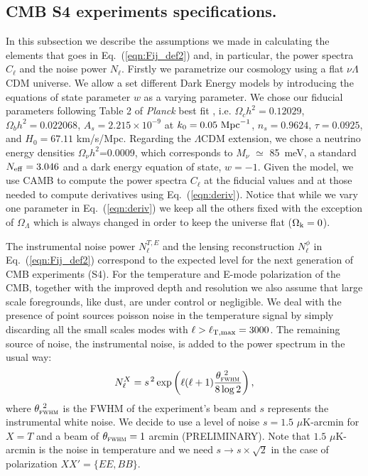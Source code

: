 \documentclass[aps,prd,reprint,superscriptaddress]{revtex4-1}
\newcommand\refeq[1]{Eq.~(\ref{eqn:#1})}
\begin{document}
\subsection{CMB S4 experiments specifications.\label{subsec:cosmo-noise}}
In this subsection we describe the assumptions we made in calculating the elements that goes in \refeq{Fij_def2} and, in particular, the power spectra $C_{\ell}$ and the noise power $N_{\ell}$.
Firstly we parametrize our cosmology using a flat $\nu \Lambda$CDM universe. We allow a set different Dark Energy models by introducing the equations of state parameter $w$ as a varying parameter.
We chose our fiducial parameters following Table 2 of \textit{Planck} best fit \cite{planck-collaboration:2014g}, i.e. $\Omega_c h^2 = 0.12029$, $\Omega_b h^2 = 0.022068$, $A_s = 2.215\times10^{-9}$ at $k_0 = 0.05\ {\rm Mpc}^{-1}$, $n_s = 0.9624$, $\tau = 0.0925$, and $H_0 = 67.11$ km/s/Mpc. Regarding the $\Lambda$CDM extension, we chose a neutrino energy densities $\Omega_{\nu} h^2$=0.0009, which corresponds to $M_{\nu}$ $\simeq$ 85\ meV, a standard $N_{\rm eff}=3.046$ and a dark energy equation of state, $w=-1$.
Given the model, we use CAMB \cite{Lewis:1999bs} to compute the power spectra $C_{\ell}$ at the fiducial values and at those needed to compute derivatives using \refeq{deriv}. Notice that while we vary one parameter in \refeq{deriv} we keep all the others fixed with the exception of $\Omega_{\Lambda}$ which is always changed in order to keep the universe flat ($\Omega_{\rm k} = 0$).

The instrumental noise power $N_{\ell}^{T,E}$ and the lensing reconstruction $N_{\ell}^{\phi}$ in \refeq{Fij_def2} correspond to the expected level for the next generation of CMB experiments (S4).
For the temperature and E-mode polarization of the CMB, together with the improved depth and resolution we also assume that large scale foregrounds, like dust, are under control or negligible. We deal with the presence of point sources poisson noise in the temperature signal by simply discarding all the small scales modes with $\ell>\ell_{\rm T,max}=3000$.
The remaining source of noise, the instrumental noise, is added to the power spectrum in the usual way:
 \begin{equation}
 	\centering
		N^{X}_\ell = s^{\, 2} \exp \left(\ell(\ell+1) \frac{\theta^{\ 2}_{\textsc{fwhm}}}{8\log2}\right),
	\label{eq:beamnoise}
\end{equation}
where $\theta^{\ 2}_{\textsc{fwhm}}$ is the FWHM of the experiment's beam and $s$ represents the instrumental white noise.
We decide to use a level of noise $s = 1.5$ $\mu$K-arcmin for $X=T$ and a beam of $\theta_{\textsc{fwhm}}=1$ arcmin (PRELIMINARY).
Note that $1.5$ $\mu$K-arcmin is the noise in temperature and we need $s \rightarrow s\times \sqrt{2}$ in the case of polarization $ XX' = \{ EE, BB \}$.
\end{document}
